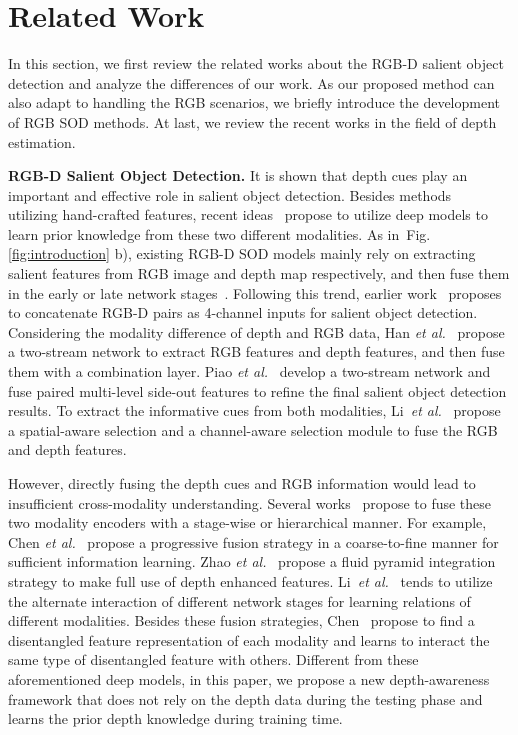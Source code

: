 \documentclass[journal]{IEEEtran}
\def\etal{{\em et al.}}
\newcommand{\figref}[1]{Fig. \ref{#1}}
\begin{document}
\section{Related Work}\label{sec:relatedwork}
 In this section, we first review the related works about the RGB-D salient object detection and analyze the differences of our work. As our proposed method can also adapt to handling the RGB scenarios, we briefly introduce the development of RGB SOD methods. At last, we review the recent works in the field of depth estimation.


\textbf{RGB-D Salient Object Detection.}
It is shown that depth cues play an important and effective role in salient object detection. Besides methods~\cite{desingh2013depth,song2017depth} utilizing hand-crafted features, recent ideas~\cite{qu2017rgbd,chen2018progressively,chen2019multi,chen2019three,
zhang2020select,fan2019D3Net,chen2020dpanet,li2020asif,zhang2020uc,li2020rgb,li2020icnet,chen2020rgbd,Wei2020ECCV,oursMM,bai2021circular} propose to utilize deep models to learn prior knowledge from these two different modalities. As in~\figref{fig:introduction} b), existing RGB-D SOD models mainly rely on extracting salient features from RGB image and depth map respectively, and then fuse them in the early or late network stages~\cite{zhou2020rgb}.
 Following this trend, earlier work~\cite{peng2014rgbd} proposes to concatenate RGB-D pairs as 4-channel inputs for salient object detection. Considering the modality difference of depth and RGB data,
Han \etal~\cite{han2017cnns} propose a two-stream network to extract RGB features and depth features, and then fuse them with a combination layer. Piao \etal~\cite{piao2019depth} develop a two-stream network and fuse paired multi-level side-out features to refine the final salient object detection results. To extract the informative cues from both modalities, Li~\etal~\cite{li2020rgb} propose a spatial-aware selection and a channel-aware selection module to fuse the RGB and depth features.


However, directly fusing the depth cues and RGB information would lead to insufficient cross-modality understanding. Several works~\cite{li2021hierarchical,chen2018progressively,zhao2019contrast,zhao2019pyramid} propose to fuse these two modality encoders with a stage-wise or hierarchical manner. For example, Chen \etal~\cite{chen2018progressively} propose a progressive fusion strategy in a coarse-to-fine manner for sufficient information learning.  Zhao \etal~\cite{zhao2019pyramid} propose a fluid pyramid integration strategy to make full use of depth enhanced features.  Li~\etal~\cite{li2021hierarchical} tends to utilize the alternate interaction of different network stages for learning relations of different modalities.  Besides these fusion strategies, Chen~\cite{chen2020rgbd} propose to find a disentangled feature representation of each modality and learns to interact the same type of disentangled feature with others. Different from these aforementioned deep models, in this paper, we propose a new depth-awareness framework that does not rely on the depth data during the testing phase and learns the prior depth knowledge during training time.
\end{document}
